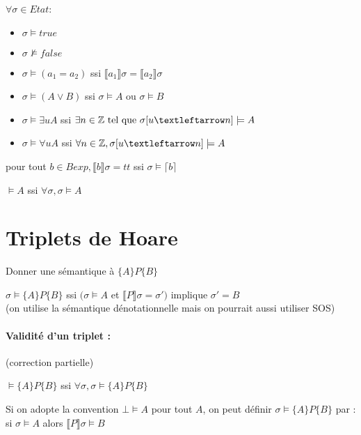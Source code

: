 \documentclass[10pt,a4paper]{article}
\newcommand{\semm}[1]{\llbracket #1 \rrbracket }
\begin{document}
$\forall \sigma \in Etat$:
\begin{itemize}
 \item $\sigma \models true$
\item $\sigma \not \models false$
\item $\sigma \models (a_1 = a_2)$ ssi $\semm{a_1} \sigma  = \semm{a_2} \sigma  $
\item $\sigma \models (A \vee B )$ ssi $\sigma \models A$ ou $\sigma  \models B$
\item $\sigma \models \exists u A$ ssi $\exists n \in \Zs \tq \sigma[u←n] \models A$
\item $\sigma \models \forall u A$ ssi $\forall n \in \Zs, \sigma[u←n] \models A$
\end{itemize}
\begin{prop}
 pour tout $b \in Bexp, \semm{b} \sigma = tt$ ssi $\sigma \models \lceil b \rceil$
\end{prop}
\begin{definition}[tautologie]
$\models A$ ssi $\forall \sigma, \sigma \models A $
\end{definition}

\section{Triplets de Hoare}
Donner une sémantique à $\{A\}P\{B\}$

\begin{definition}
 $\sigma \models \{A\}P\{B\}$ ssi $(\sigma \models A$ et $\semm{P} \sigma = \sigma')$ implique $\sigma' = B$\\
(on utilise la sémantique dénotationnelle mais on pourrait aussi utiliser SOS)
\end{definition}

\paragraph{Validité d'un triplet :} (correction partielle)
\begin{definition}
 $\models \{A\}P\{B\}$ ssi $\forall \sigma, \sigma \models \{A\}P\{B\}$
\end{definition}
\begin{rem}
 Si on adopte la convention $\bot \models A$ pour tout $A$, on peut définir $\sigma \models \{A\}P\{B\}$ par :\\
si $\sigma \models A$ alors $\semm{P} \sigma \models B$
\end{rem}
\end{document}
